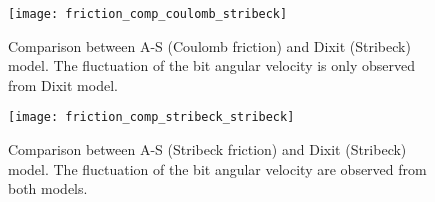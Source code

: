 \begin{figure}
	\centering
	\texttt{[image: friction\_comp\_coulomb\_stribeck]}
    \caption[Comparison between A-S (Coulomb friction) and Dixit (Stribeck friction) model.]{Comparison between A-S (Coulomb friction) and Dixit (Stribeck) model. The fluctuation of the bit angular velocity is only observed from Dixit model.}\label{figure_coloumb_coulomb}
\end{figure}

\begin{figure}
	\centering
	\texttt{[image: friction\_comp\_stribeck\_stribeck]}
    \caption[Comparison between A-S (Stribeck friction) and Dixit (Stribeck friction) model.]{Comparison between A-S (Stribeck friction) and Dixit (Stribeck) model. The fluctuation of the bit angular velocity are observed from both models.}
    \label{figure_coulomb_stribeck}
\end{figure}

